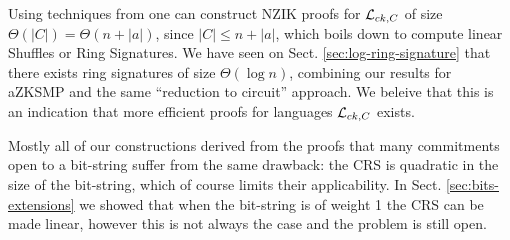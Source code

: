 Using techniques from \cite{EC:GroOstSah06} one can construct NZIK proofs for $\mathcal{L}_{ck,C}$ of size $\Theta(|C|)=\Theta(n+|a|)$, since $|C|\leq n+|a|$, which boils down to compute linear Shuffles or Ring Signatures. We have seen on Sect. \ref{sec:log-ring-signature} that there exists ring signatures of size $\Theta(\log n)$, combining our results for aZKSMP and the same ``reduction to circuit'' approach. We beleive that this is an indication that more efficient proofs for languages $\mathcal{L}_{ck,C}$ exists.

Mostly all of our constructions derived from the proofs that many commitments open to a bit-string suffer from the same drawback: the CRS is quadratic in the size of the bit-string, which of course limits their applicability. In Sect. \ref{sec:bits-extensions} we showed that when the bit-string is of weight 1 the CRS can be made linear, however this is not always the case and the problem is still open.
 
